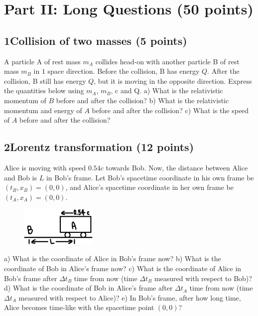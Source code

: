 \documentclass[12pt]{book} %
\numberwithin{equation}{chapter}
\def\D{\Delta}
\def\lq{\hspace{2.5ex}}
\begin{document}
\section*{Part II: Long Questions (50 points)}
\subsection*{1\lq Collision of two masses (5 points)}
A particle A of rest mass $m_{A}$ collides head-on with another particle B of rest mass $m_{B}$ in $1$ space direction. Before the collision, B has energy $Q$. After the collision, B still has energy $Q$, but it is moving in the opposite direction. Express the quantities below using $m_{A}$, $m_{B}$, c and Q.\bigskip\newline
a) What is the relativistic momentum of $B$ before and after the collision?\bigskip\newline
b) What is the relativistic momentum and energy of $A$ before and after the collision?\bigskip\newline
c) What is the speed of $A$ before and after the collision?

\subsection*{2\lq Lorentz transformation (12 points)}
Alice is moving with speed $0.54c$ towards Bob. Now, the distance between Alice and Bob is $L$ in Bob's frame. Let Bob's spacetime coordinate in his own frame be $(t_{B}, x_{B})=(0, 0)$, and Alice's spacetime coordinate in her own frame be $(t_{A}, x_{A})=(0, 0)$.
\begin{figure}[H]
\centering
\includegraphics[width=0.325\textwidth, left]{Lorentz transformation}
\end{figure}
\noindent a) What is the coordinate of Alice in Bob's frame now?\bigskip\newline
b) What is the coordinate of Bob in Alice's frame now?\bigskip\newline
c) What is the coordinate of Alice in Bob's frame after $\D t_{B}$ time from now (time $\D t_{B}$ measured with respect to Bob)?\bigskip\newline
d) What is the coordinate of Bob in Alice's frame after $\D t_{A}$ time from now (time $\D t_{A}$ measured with respect to Alice)?\bigskip\newline
e) In Bob's frame, after how long time, Alice becomes time-like with the spacetime point $(0, 0)$?
\end{document}

